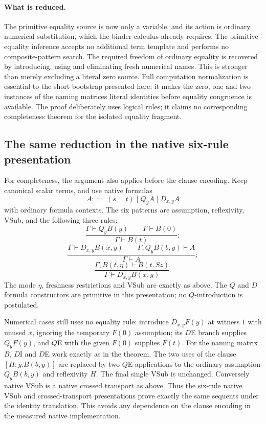 \paragraph{What is reduced.}
The primitive equality source is now only a variable, and its action
is ordinary numerical substitution, which the binder calculus already
requires. The primitive equality inference accepts no additional term
template and performs no composite-pattern search. The required freedom
of ordinary equality is recovered by introducing, using and eliminating
fresh numerical names. This is stronger than merely excluding a literal
zero source. Full computation normalization is essential to the short
bootstrap presented here: it makes the zero, one and two instances of
the naming matrices literal identities before equality congruence is
available. The proof deliberately uses logical rules; it claims no
corresponding completeness theorem for the isolated equality fragment.


\subsection{The same reduction in the native six-rule presentation}

For completeness, the argument also applies before the clause
encoding. Keep canonical scalar terms, and use native formulas
\[
 A::=(s=t)\mid Q_yA\mid D_{x,y}A
\]
with ordinary formula contexts. The six patterns are assumption,
reflexivity, VSub, and the following three rules:
\[
 \frac{\Gamma\vdash Q_yB(y)\qquad\Gamma\vdash B(0)}
      {\Gamma\vdash B(t)};\tag{$Q$E}
\]
\[
 \frac{\Gamma\vdash D_{x,y}B(x,y)\qquad
       \Gamma,Q_yB(b,y)\vdash A}
      {\Gamma\vdash A};\tag{$D$E}
\]
\[
 \frac{\Gamma,B(t,\eta)\vdash B(t,Sz)}
      {\Gamma\vdash D_{x,y}B(x,y)}.\tag{$D$I}
\]
The mode $\eta$, freshness restrictions and VSub are exactly as
above. The $Q$ and $D$ formula constructors are primitive in this
presentation; no $Q$-introduction is postulated.

Numerical cases still uses no equality rule: introduce
$D_{x,y}F(y)$ at witness $1$ with unused $x$, ignoring the temporary
$F(0)$ assumption; its $D$E branch supplies $Q_yF(y)$, and $Q$E
with the given $F(0)$ supplies $F(t)$. For the naming matrix $B$,
$D$I and $D$E work exactly as in the theorem. The two uses of the
clause $[H;y.B(b,y)]$ are replaced by two $Q$E applications to the
ordinary assumption $Q_yB(b,y)$ and reflexivity $H$. The final single
VSub is unchanged. Conversely native VSub is a native crossed
transport as above. Thus the six-rule native VSub and crossed-transport
presentations prove exactly the same sequents under the identity
translation. This avoids any dependence on the clause encoding in
the measured native implementation.

